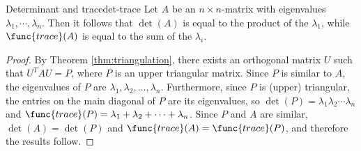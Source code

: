 \begin{corollary}{Determinant and trace}{det-trace}
Let $A$ be an $n \times n$-matrix with eigenvalues $\lambda_1, \cdots, \lambda_n$. Then it follows that $\det(A)$ is equal to the product of the $\lambda_1$, while $\func{trace}(A)$ is equal to the sum of the $\lambda_i$. 
\end{corollary}

\begin{proof}
By Theorem \ref{thm:triangulation}, there exists an orthogonal matrix $U$ such
that $U^TAU=P$, where $P$ is an upper triangular matrix.
Since $P$ is similar to $A$, the eigenvalues
of $P$ are $\lambda_1, \lambda_2, \ldots, \lambda_n$.
Furthermore, since $P$ is (upper) triangular, the entries on the
main diagonal of $P$ are its eigenvalues, so
$\det(P)=\lambda_1 \lambda_2 \cdots \lambda_n$ and
$\func{trace}(P)=\lambda_1 + \lambda_2 + \cdots + \lambda_n$.
Since $P$ and $A$ are similar, $\det(A)=\det(P)$ and $\func{trace}(A)=\func{trace}(P)$,
and therefore the results follow.
\end{proof}
